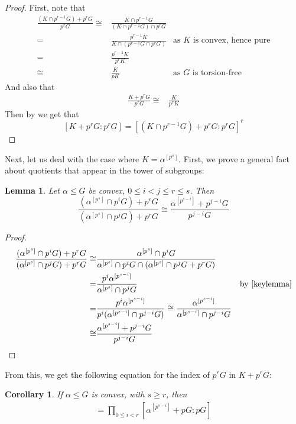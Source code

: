 \documentclass[a4paper,11pt]{article}
\newtheorem{lemma}[theorem]{Lemma}
\newtheorem{corollary}[theorem]{Corollary}
\newcommand{\tx}{\textrm}
\begin{document}
\begin{proof}
	First, note that
	\begin{align*}
		\frac{(K\cap p^{r-1}G) +p^rG}{p^rG} \cong& \frac{K\cap p^{r-1}G}{(K\cap p^{r-1}G)\cap p^rG} \\
		=&\frac{p^{r-1}K}{K\cap(p^{r-1}G \cap p^rG)} &\textrm{as $K$ is convex, hence pure}\\
		=&\frac{p^{r-1}K}{p^rK} \\
		\cong&\frac{K}{pK} &\textrm{as $G$ is torsion-free}
	\end{align*}
	And also that
	\begin{align*}
		\frac{K+p^rG}{p^rG} \cong& \frac{K}{p^rK}
	\end{align*}
	Then by  we get that $$[K+p^rG:p^rG]=[(K\cap p^{r-1}G)+p^rG:p^rG]^r$$
\end{proof}
\noindent Next, let us deal with the case where $K=\alpha^{[p^s]}$. First, we prove a general fact about quotients that appear in the tower of subgroups:
\begin{lemma}
	Let $\alpha\leq G$ be convex, $0\leq i < j\leq r\leq s$. Then $$\frac{(\alpha^{[p^s]}\cap p^iG) + p^rG}{(\alpha^{[p^s]}\cap p^jG)+p^rG} \cong \frac{\alpha^{[p^{s-i}]}+p^{j-i}G}{p^{j-i}G}$$
\end{lemma}
\begin{proof}
	\begin{align*}
		\frac{(\alpha^{[p^s]}\cap p^iG) + p^rG}{(\alpha^{[p^s]}\cap p^jG) + p^rG} \cong& \frac{\alpha^{[p^s]}\cap p^iG}{\alpha^{[p^s]}\cap p^iG\cap(\alpha^{[p^s]}\cap p^jG + p^rG)} \\
		=& \frac{p^i\alpha^{[p^{s-i}]}}{\alpha^{[p^s]}\cap p^jG} & \tx{by \Cref{keylemma}} \\
		=& \frac{p^i\alpha^{[p^{s-i}]}}{p^i(\alpha^{[p^{s-i}]}\cap p^{j-i}G)} \cong \frac{\alpha^{[p^{s-i}]}}{\alpha^{[p^{s-i}]}\cap p^{j-i}G} \\
		\cong& \frac{\alpha^{[p^{s-i}]} +p^{j-i}G}{p^{j-i}G}
	\end{align*}
\end{proof}
\noindent From this, we get the following equation for the index of $p^rG$ in $K+p^rG$:
\begin{corollary}\label{leftconvexnonconvexrelationship1}
    If $\alpha\leq G$ is convex, with $s\geq r$, then
	\begin{align*}
	    [\alpha^{[p^s]}+p^rG:p^rG] = \prod\limits_{0\leq i< r}[\alpha^{[p^{s-i}]}+pG:pG]
	\end{align*}
\end{corollary}
\end{document}
